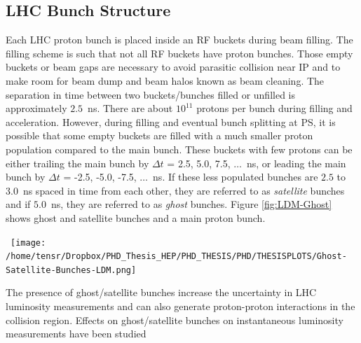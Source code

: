 \subsection{LHC Bunch Structure}
Each LHC proton bunch is placed inside an RF buckets during beam filling. %
The filling scheme is such that not all RF buckets have proton bunches. 
Those empty buckets or beam gaps are necessary to avoid parasitic collision near IP and to make room for beam dump and beam halos known as beam cleaning.%
The separation in time between two buckets/bunches filled or unfilled is approximately $2.5$~ns. There are  about $10^{11}$ protons per bunch during filling and acceleration.
However, during filling and eventual bunch splitting at PS, it is possible that some empty buckets are filled with a much smaller proton population compared to the main bunch. These buckets with few protons can be either trailing the main bunch by $\Delta t$ = 2.5, 5.0, 7.5, $\ldots$~ns, or leading the main bunch by $\Delta t$ = -2.5, -5.0, -7.5, $\ldots$~ns. If these less populated bunches are $2.5$ to $3.0$~ns spaced in time from each other, they are referred to as \textit{satellite} bunches and if $5.0$~ns, they are referred to as \textit{ghost} bunches. Figure \ref{fig:LDM-Ghost} shows ghost and satellite bunches and a main proton bunch.
\begin{center}
\centering
\mbox{
\texttt{[image: /home/tensr/Dropbox/PHD\_Thesis\_HEP/PHD\_THESIS/PHD/THESISPLOTS/Ghost-Satellite-Bunches-LDM.png]}} 
\label{fig:LDM-Ghost}
\end{center}
The presence of ghost/satellite bunches increase the uncertainty in LHC luminosity measurements and can also generate proton-proton interactions in the collision region. Effects on ghost/satellite bunches on instantaneous luminosity measurements have been studied 
